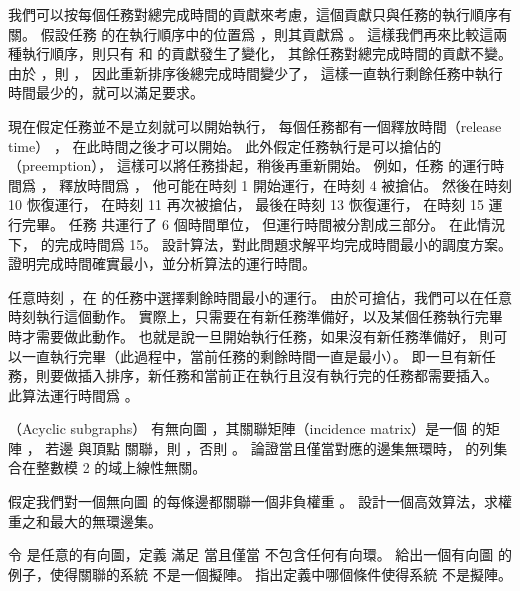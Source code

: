 我們可以按每個任務對總完成時間的貢獻來考慮，這個貢獻只與任務的執行順序有關。
假設任務  的在執行順序中的位置爲 ，則其貢獻爲 。
這樣我們再來比較這兩種執行順序，則只有  和  的貢獻發生了變化，
其餘任務對總完成時間的貢獻不變。
由於 ，則 ，
因此重新排序後總完成時間變少了，
這樣一直執行剩餘任務中執行時間最少的，就可以滿足要求。

\stopANSWER

\startitem
現在假定任務並不是立刻就可以開始執行，
每個任務都有一個{\EMP 釋放時間（release time）} ，
在此時間之後才可以開始。
此外假定任務執行是可以{\EMP 搶佔的（preemption）}，
這樣可以將任務掛起，稍後再重新開始。
例如，任務  的運行時間爲 ，
釋放時間爲 ，
他可能在時刻 1 開始運行，在時刻 4 被搶佔。
然後在時刻 10 恢復運行，
在時刻 11 再次被搶佔，
最後在時刻 13 恢復運行，
在時刻 15 運行完畢。
任務  共運行了 6 個時間單位，
但運行時間被分割成三部分。
在此情況下，  的完成時間爲 15。
設計算法，對此問題求解平均完成時間最小的調度方案。
證明完成時間確實最小，並分析算法的運行時間。
\stopitem

\startANSWER
任意時刻 ，在  的任務中選擇{\EMP 剩餘}時間最小的運行。
由於可搶佔，我們可以在任意時刻執行這個動作。
實際上，只需要在有新任務準備好，以及某個任務執行完畢時才需要做此動作。
也就是說一旦開始執行任務，如果沒有新任務準備好，
則可以一直執行完畢（此過程中，當前任務的剩餘時間一直是最小）。
即一旦有新任務，則要做插入排序，新任務和當前正在執行且沒有執行完的任務都需要插入。
此算法運行時間爲 。
\stopANSWER

\stopigBase
\stopPROBLEM

\startPROBLEM
（Acyclic subgraphs）
\startigBase[a]
\startitem
有無向圖 ，其{\EMP 關聯矩陣（incidence matrix）}是一個  的矩陣 ，
若邊  與頂點  關聯，則 ，否則 。
論證當且僅當對應的邊集無環時，  的列集合在整數模 2 的域上線性無關。
\stopitem

\startANSWER
\TODO{}
\stopANSWER

\startitem
假定我們對一個無向圖  的每條邊都關聯一個非負權重 。
設計一個高效算法，求權重之和最大的無環邊集。
\stopitem

\startANSWER
\TODO{}
\stopANSWER

\startitem
令  是任意的有向圖，定義  滿足  當且僅當  不包含任何有向環。
給出一個有向圖  的例子，使得關聯的系統  不是一個擬陣。
指出定義中哪個條件使得系統  不是擬陣。
\stopitem

